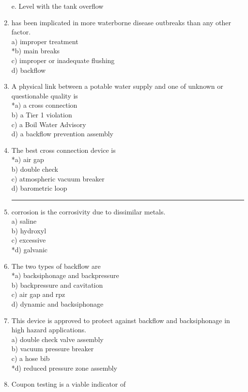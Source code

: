 \begin{enumerate}[1.]
e. Level with the tank overflow\\
\item has been implicated in more waterborne disease outbreaks than any other factor.\\
a) improper treatment\\
*b) main breaks\\
c) improper or inadequate flushing\\
d) backflow\\
\item A physical link between a potable water supply and one of unknown or questionable quality is\\
*a) a cross connection\\
b) a Tier 1 violation\\
c) a Boil Water Advisory\\
d) a backflow prevention assembly\\
\item The best cross connection device is\\
*a) air gap\\
b) double check\\
c) atmospheric vacuum breaker\\
d) barometric loop\\
\item \rule{2cm}{0.5pt}corrosion is the corrosivity due to dissimilar metals.\\
a) saline\\
b) hydroxyl\\
c) excessive\\
*d) galvanic\\
\item The two types of backflow are\\
*a) backsiphonage and backpressure\\
b) backpressure and cavitation\\
c) air gap and rpz\\
d) dynamic and backsiphonage\\
\item This device is approved to protect against backflow and backsiphonage in high hazard applications.\\
a) double check valve assembly\\
b) vacuum pressure breaker\\
c) a hose bib\\
*d) reduced pressure zone assembly\\
\item Coupon testing is a viable indicator of\\

\end{enumerate}
